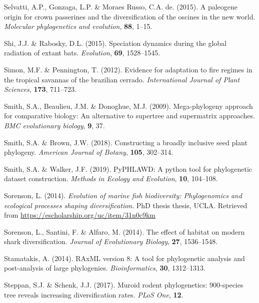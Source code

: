 \documentclass[]{article}
\begin{document}
\leavevmode\hypertarget{ref-selvatti2015paleogene}{}%
Selvatti, A.P., Gonzaga, L.P. \& Moraes Russo, C.A. de. (2015). A paleogene origin for crown passerines and the diversification of the oscines in the new world. \emph{Molecular phylogenetics and evolution}, \textbf{88}, 1--15.

\leavevmode\hypertarget{ref-shi2015speciation}{}%
Shi, J.J. \& Rabosky, D.L. (2015). Speciation dynamics during the global radiation of extant bats. \emph{Evolution}, \textbf{69}, 1528--1545.

\leavevmode\hypertarget{ref-simon2012cerrado}{}%
Simon, M.F. \& Pennington, T. (2012). Evidence for adaptation to fire regimes in the tropical savannas of the brazilian cerrado. \emph{International Journal of Plant Sciences}, \textbf{173}, 711--723.

\leavevmode\hypertarget{ref-smith2009mega}{}%
Smith, S.A., Beaulieu, J.M. \& Donoghue, M.J. (2009). Mega-phylogeny approach for comparative biology: An alternative to supertree and supermatrix approaches. \emph{BMC evolutionary biology}, \textbf{9}, 37.

\leavevmode\hypertarget{ref-smith2018constructing}{}%
Smith, S.A. \& Brown, J.W. (2018). Constructing a broadly inclusive seed plant phylogeny. \emph{American Journal of Botany}, \textbf{105}, 302--314.

\leavevmode\hypertarget{ref-smith2019pyphlawd}{}%
Smith, S.A. \& Walker, J.F. (2019). PyPHLAWD: A python tool for phylogenetic dataset construction. \emph{Methods in Ecology and Evolution}, \textbf{10}, 104--108.

\leavevmode\hypertarget{ref-sorenson2014evolution}{}%
Sorenson, L. (2014). \emph{Evolution of marine fish biodiversity: Phylogenomics and ecological processes shaping diversification}. PhD thesis thesis, UCLA. Retrieved from \url{https://escholarship.org/uc/item/31n0c9km}

\leavevmode\hypertarget{ref-sorenson2014effect}{}%
Sorenson, L., Santini, F. \& Alfaro, M. (2014). The effect of habitat on modern shark diversification. \emph{Journal of Evolutionary Biology}, \textbf{27}, 1536--1548.

\leavevmode\hypertarget{ref-stamatakis2014raxml}{}%
Stamatakis, A. (2014). RAxML version 8: A tool for phylogenetic analysis and post-analysis of large phylogenies. \emph{Bioinformatics}, \textbf{30}, 1312--1313.

\leavevmode\hypertarget{ref-steppan2017muroid}{}%
Steppan, S.J. \& Schenk, J.J. (2017). Muroid rodent phylogenetics: 900-species tree reveals increasing diversification rates. \emph{PLoS One}, \textbf{12}.
\end{document}
